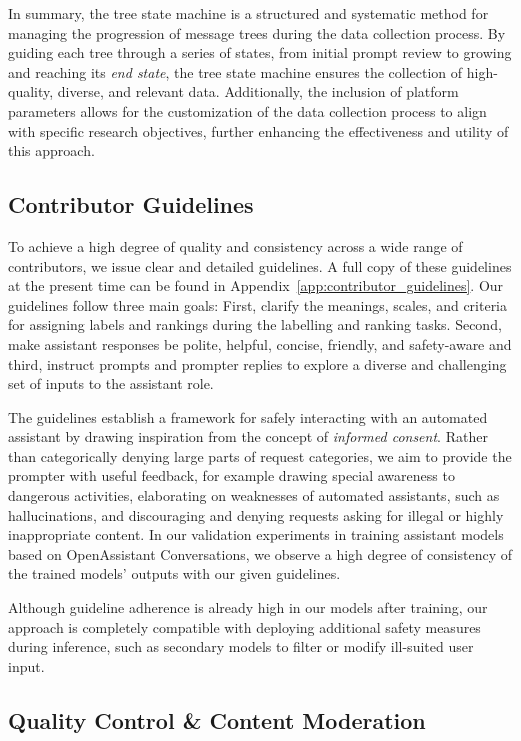 In summary, the tree state machine is a structured and systematic method for managing the progression of message trees during the data collection process. By guiding each tree through a series of states, from initial prompt review to growing and reaching its \emph{end state}, the tree state machine ensures the collection of high-quality, diverse, and relevant data. Additionally, the inclusion of platform parameters allows for the customization of the data collection process to align with specific research objectives, further enhancing the effectiveness and utility of this approach.

\subsection{Contributor Guidelines}

To achieve a high degree of quality and consistency across a wide range of contributors, we issue clear and detailed guidelines. A full copy of these guidelines at the present time can be found in Appendix~\ref{app:contributor_guidelines}.
Our guidelines follow three main goals: First, clarify the meanings, scales, and criteria for assigning labels and rankings during the labelling and ranking tasks. Second, make assistant responses be polite, helpful, concise, friendly, and safety-aware and third, instruct prompts and prompter replies to explore a diverse and challenging set of inputs to the assistant role.

The guidelines establish a framework for safely interacting with an automated assistant by drawing inspiration from the concept of \emph{informed consent}. Rather than categorically denying large parts of request categories, we aim to provide the prompter with useful feedback, for example drawing special awareness to dangerous activities, elaborating on weaknesses of automated assistants, such as hallucinations, and discouraging and denying requests asking for illegal or highly inappropriate content. In our validation experiments in training assistant models based on OpenAssistant Conversations, we observe a high degree of consistency of the trained models' outputs with our given guidelines.

Although guideline adherence is already high in our models after training, our approach is completely compatible with deploying additional safety measures during inference, such as secondary models to filter or modify ill-suited user input.

\subsection{Quality Control \& Content Moderation}

